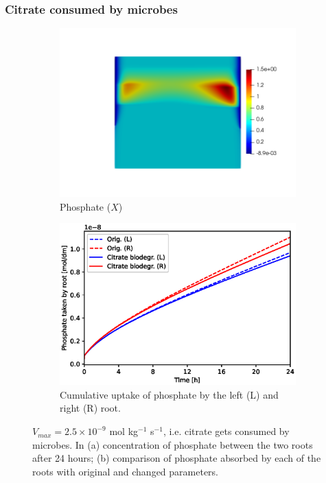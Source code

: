 \documentclass[11pt]{article}
\numberwithin{equation}{section}
\begin{document}
\subsubsection{Citrate consumed by microbes}
\begin{figure}[!htb]
\centering
\begin{subfigure}[t]{0.45\textwidth}
    \includegraphics[trim= 100 100 60 100,width=\textwidth]{Figures/X_citrateVmaxnonzero.png}
    \caption{Phosphate ($X$)}
\end{subfigure}
\qquad
\begin{subfigure}[t]{0.45\textwidth}
    \includegraphics[width=\textwidth]{Figures/citratevmaxnonzero.eps}
    \caption{Cumulative uptake of phosphate by the left (L) and right (R) root.}
\end{subfigure}

\caption{$V_{max} = 2.5 \times 10^{-9}$ mol kg$^{-1}$ s$^{-1}$, i.e. citrate gets consumed by microbes. In (a) concentration of phosphate between the two roots after 24 hours; (b) comparison of phosphate absorbed by each of the roots with original and changed parameters.}
\end{figure}
\end{document}
